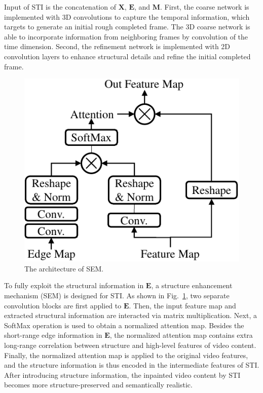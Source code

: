 %
Input of STI is the concatenation of $\boldsymbol{X}$, $\boldsymbol{E}$, and $\boldsymbol{M}$.
First, the coarse network is implemented with 3D convolutions to capture the temporal information, which targets to generate an initial rough completed frame. The 3D coarse network is able to incorporate information from neighboring frames by convolution of the time dimension.
Second, the refinement network is implemented with 2D convolution layers to enhance structural details and refine the initial completed frame.

\begin{figure}[t]
	\centering
	\includegraphics[width=0.65\columnwidth]{SEM} %
	\caption{The architecture of SEM.}
	\label{SEM}
\end{figure}

To fully exploit the structural information in $\boldsymbol{E}$, a structure enhancement mechanism (SEM) is designed for STI.
As shown in Fig.~\ref{SEM}, two separate convolution blocks are first applied to $\boldsymbol{E}$.
Then, the input feature map and extracted structural information are interacted via matrix multiplication. 
Next, a SoftMax operation is used to obtain a normalized attention map.
Besides the short-range edge information in $\boldsymbol{E}$, the normalized attention map contains extra long-range correlation between structure and high-level features of video content.
Finally, the normalized attention map is applied to the original video features, and the structure information is thus encoded in the intermediate features of STI.
After introducing structure information, the inpainted video content by STI becomes more structure-preserved and semantically realistic.

